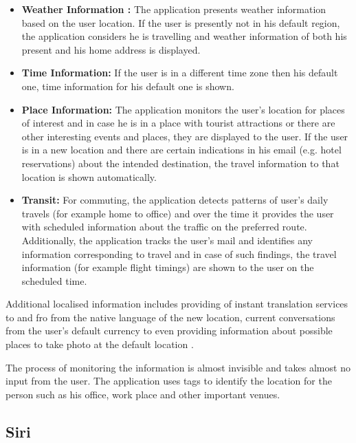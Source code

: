 \documentclass[12pt]{report}
\begin{document}
\begin{itemize}
\item \textbf{Weather Information :} The application presents weather information based on the user location. If the user is presently not in his default region, the application considers he is travelling and weather information of both his present and his home address is displayed.

\item \textbf{Time Information:} If the user is in a different time zone then his default one, time information for his default one is shown.

\item \textbf{Place Information:} The application monitors the user's location for places of interest and in case he is in a place with tourist attractions or there are other interesting events and places, they are displayed to the user. If the user is in a new location and there are certain indications in his email (e.g. hotel reservations) about the intended destination, the travel information to that location is shown automatically.

\item \textbf{Transit:} For commuting, the application detects patterns of user's daily travels (for example home to office) and over the time it provides the user with scheduled information about the traffic on the preferred route. Additionally, the application tracks the user's mail and identifies any information corresponding to travel and in case of such findings, the travel information (for example flight timings) are shown to the user on the scheduled time.
\end{itemize}

Additional localised information includes providing of instant translation services to and fro from the native language of the new location, current conversations from the user's default currency to even providing information about possible places to take photo at the default location \cite{google2014app}.
 
The process of monitoring the information is almost invisible and takes almost no input from the user. The application uses tags to identify the location for the person such as his office, work place and other important venues.

\subsection{Siri}
\end{document}
